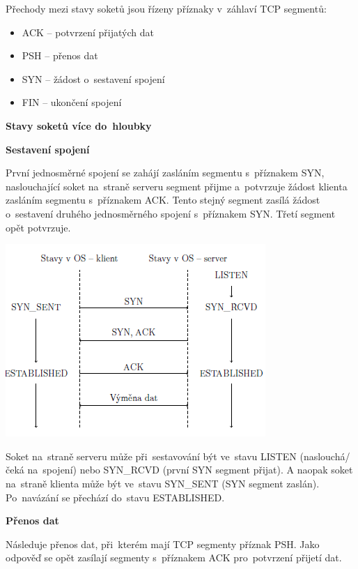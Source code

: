 Přechody mezi stavy soketů jsou řízeny příznaky v~záhlaví TCP segmentů:
\begin{itemize}
	\item ACK -- potvrzení přijatých dat
	\item PSH -- přenos dat
	\item SYN -- žádost o~sestavení spojení
	\item FIN -- ukončení spojení
\end{itemize}

\begin{Large}
	\vspace{0,5cm}
	\textbf{Stavy soketů více do~hloubky}
\end{Large}

\vspace{0,5cm}
\textbf{Sestavení spojení}

První jednosměrné spojení se zahájí zasláním segmentu s~příznakem SYN, naslouchající soket na~straně serveru segment přijme a~potvrzuje žádost klienta zasláním segmentu s~příznakem ACK. Tento stejný segment zasílá žádost o~sestavení druhého jednosměrného spojení s~příznakem SYN. Třetí segment opět potvrzuje. 

\begin{center}
	\includegraphics[scale=1]{images/network_three_handshake.png}
\end{center}

Soket na~straně serveru může při~sestavování být ve~stavu LISTEN (naslouchá/čeká na~spojení) nebo SYN\_RCVD (první SYN segment přijat). A naopak soket na~straně klienta může být ve~stavu SYN\_SENT (SYN segment zaslán). Po~navázání se přechází do~stavu ESTABLISHED.

\vspace{0,5cm}
\textbf{Přenos dat}

Následuje přenos dat, při~kterém mají TCP segmenty příznak PSH. Jako odpověď se opět zasílají segmenty s~příznakem ACK pro~potvrzení přijetí dat. 


